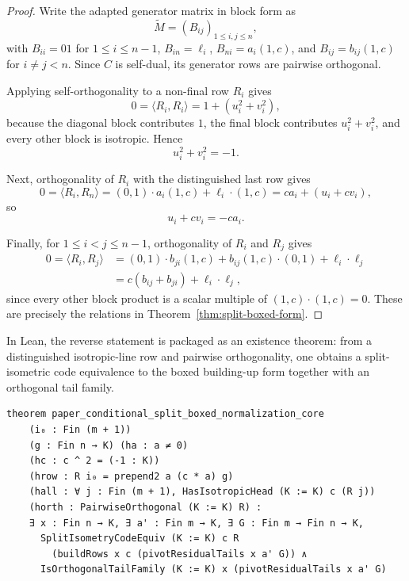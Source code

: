 \documentclass[12pt]{article}
\newtheorem{remark}[theorem]{Remark}
\begin{document}
\begin{proof}
Write the adapted generator matrix in block form as
\[
\widetilde M=(B_{ij})_{1\le i,j\le n},
\]
with \(B_{ii}=01\) for \(1\le i\le n-1\), \(B_{in}=\ell_i\), \(B_{ni}=a_i(1,c)\), and \(B_{ij}=b_{ij}(1,c)\) for \(i\neq j<n\). Since \(C\) is self-dual, its generator rows are pairwise orthogonal.

Applying self-orthogonality to a non-final row \(R_i\) gives
\[
0=\langle R_i,R_i\rangle
=
1+(u_i^2+v_i^2),
\]
because the diagonal block contributes \(1\), the final block contributes \(u_i^2+v_i^2\), and every other block is isotropic. Hence
\[
u_i^2+v_i^2=-1.
\]

Next, orthogonality of \(R_i\) with the distinguished last row gives
\[
0=\langle R_i,R_n\rangle
=
(0,1)\cdot a_i(1,c)+\ell_i\cdot(1,c)
=
c a_i+(u_i+c v_i),
\]
so
\[
u_i+c v_i=-c a_i.
\]

Finally, for \(1\le i<j\le n-1\), orthogonality of \(R_i\) and \(R_j\)
gives
\[
\begin{aligned}
0=\langle R_i,R_j\rangle
&=(0,1)\cdot b_{ji}(1,c)
  +b_{ij}(1,c)\cdot(0,1)+\ell_i\cdot\ell_j\\
&=c(b_{ij}+b_{ji})+\ell_i\cdot\ell_j,
\end{aligned}
\]
since every other block product is a scalar multiple of
\((1,c)\cdot(1,c)=0\).  These are precisely the relations in
Theorem~\ref{thm:split-boxed-form}.
\end{proof}

\noindent
In Lean, the reverse statement is packaged as an existence theorem: from a distinguished isotropic-line row and pairwise orthogonality, one obtains a split-isometric code equivalence to the boxed building-up form together with an orthogonal tail family.

\begin{lstlisting}[caption={Lean for Theorem~\ref{thm:conditional-split-boxed-normalization}.}]
theorem paper_conditional_split_boxed_normalization_core
    (i₀ : Fin (m + 1))
    (g : Fin n → K) (ha : a ≠ 0)
    (hc : c ^ 2 = (-1 : K))
    (hrow : R i₀ = prepend2 a (c * a) g)
    (hall : ∀ j : Fin (m + 1), HasIsotropicHead (K := K) c (R j))
    (horth : PairwiseOrthogonal (K := K) R) :
    ∃ x : Fin n → K, ∃ a' : Fin m → K, ∃ G : Fin m → Fin n → K,
      SplitIsometryCodeEquiv (K := K) c R
        (buildRows x c (pivotResidualTails x a' G)) ∧
      IsOrthogonalTailFamily (K := K) x (pivotResidualTails x a' G)
\end{lstlisting}

\end{document}
